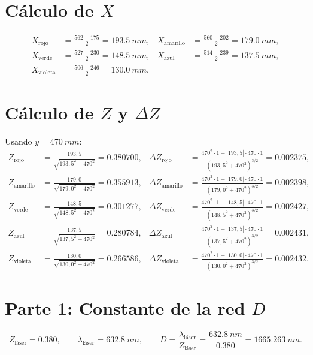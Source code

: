 \documentclass[11pt,a4paper]{article}
\begin{document}
\section*{Cálculo de \(X\)}
\begin{align*}
X_{\text{rojo}}     &= \frac{562-175}{2} = \SI{193,5}{mm},&
X_{\text{amarillo}} &= \frac{560-202}{2} = \SI{179,0}{mm},\\
X_{\text{verde}}    &= \frac{527-230}{2} = \SI{148,5}{mm},&
X_{\text{azul}}     &= \frac{514-239}{2} = \SI{137,5}{mm},\\
X_{\text{violeta}}  &= \frac{506-246}{2} = \SI{130,0}{mm}.&
\end{align*}

\section*{Cálculo de \(Z\) y \(\Delta Z\)}
Usando \(y=\SI{470}{mm}\):
\begin{align*}
Z_{\text{rojo}}     &= \frac{193,5}{\sqrt{193,5^2 + 470^2}}     = \num{0,380700}, &
\Delta Z_{\text{rojo}}     &= \frac{470^2\cdot 1 + |193,5|\cdot 470\cdot 1}{(193,5^2+470^2)^{3/2}} = \num{0,002375},\\[2mm]
Z_{\text{amarillo}} &= \frac{179,0}{\sqrt{179,0^2 + 470^2}}     = \num{0,355913}, &
\Delta Z_{\text{amarillo}} &= \frac{470^2\cdot 1 + |179,0|\cdot 470\cdot 1}{(179,0^2+470^2)^{3/2}} = \num{0,002398},\\[2mm]
Z_{\text{verde}}    &= \frac{148,5}{\sqrt{148,5^2 + 470^2}}     = \num{0,301277}, &
\Delta Z_{\text{verde}}    &= \frac{470^2\cdot 1 + |148,5|\cdot 470\cdot 1}{(148,5^2+470^2)^{3/2}} = \num{0,002427},\\[2mm]
Z_{\text{azul}}     &= \frac{137,5}{\sqrt{137,5^2 + 470^2}}     = \num{0,280784}, &
\Delta Z_{\text{azul}}     &= \frac{470^2\cdot 1 + |137,5|\cdot 470\cdot 1}{(137,5^2+470^2)^{3/2}} = \num{0,002431},\\[2mm]
Z_{\text{violeta}}  &= \frac{130,0}{\sqrt{130,0^2 + 470^2}}     = \num{0,266586}, &
\Delta Z_{\text{violeta}}  &= \frac{470^2\cdot 1 + |130,0|\cdot 470\cdot 1}{(130,0^2+470^2)^{3/2}} = \num{0,002432}.
\end{align*}

\section*{Parte 1: Constante de la red \(D\)}
\[
Z_{\text{láser}}=\num{0,380},\qquad \lambda_{\text{láser}}=\SI{632,8}{nm},\qquad
D=\frac{\lambda_{\text{láser}}}{Z_{\text{láser}}}
=\frac{\SI{632,8}{nm}}{\num{0,380}}=\SI{1665,263}{nm}.
\]
\end{document}
